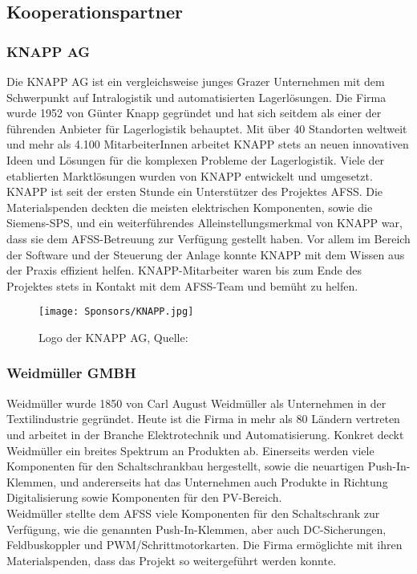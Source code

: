 \subsection{Kooperationspartner}

\subsubsection{KNAPP AG}
Die KNAPP AG ist ein vergleichsweise junges Grazer Unternehmen mit dem Schwerpunkt auf Intralogistik und automatisierten Lagerlösungen. Die Firma wurde 1952 von Günter Knapp gegründet und hat sich seitdem als einer der führenden Anbieter für Lagerlogistik behauptet. Mit über 40 Standorten weltweit und mehr als 4.100 MitarbeiterInnen arbeitet KNAPP stets an neuen innovativen Ideen und Lösungen für die komplexen Probleme der Lagerlogistik. Viele der etablierten Marktlösungen wurden von KNAPP entwickelt und umgesetzt. \cite{knapp}\\
KNAPP ist seit der ersten Stunde ein Unterstützer des Projektes AFSS. Die Materialspenden deckten die meisten elektrischen Komponenten, sowie die Siemens-SPS, und ein weiterführendes Alleinstellungsmerkmal von KNAPP war, dass sie dem AFSS-Betreuung zur Verfügung gestellt haben. Vor allem im Bereich der Software und der Steuerung der Anlage konnte KNAPP mit dem Wissen aus der Praxis effizient helfen. KNAPP-Mitarbeiter waren bis zum Ende des Projektes stets in Kontakt mit dem AFSS-Team und bemüht zu helfen.

\begin{figure}[H]
    \centering
    \texttt{[image: Sponsors/KNAPP.jpg]}
    \caption{Logo der KNAPP AG, Quelle: \cite{knapp_logo}}
    \label{fig:knapp_logo}
\end{figure}


\subsubsection{Weidmüller GMBH}

Weidmüller wurde 1850 von Carl August Weidmüller als Unternehmen in der Textilindustrie gegründet. Heute ist die Firma in mehr als 80 Ländern vertreten und arbeitet in der Branche Elektrotechnik und Automatisierung. Konkret deckt Weidmüller ein breites Spektrum an Produkten ab. Einerseits werden viele Komponenten für den Schaltschrankbau hergestellt, sowie die neuartigen Push-In-Klemmen, und andererseits hat das Unternehmen auch Produkte in Richtung Digitalisierung sowie Komponenten für den PV-Bereich. \cite{weidmueller}\\
Weidmüller stellte dem AFSS viele Komponenten für den Schaltschrank zur Verfügung, wie die genannten Push-In-Klemmen, aber auch DC-Sicherungen, Feldbuskoppler und PWM/Schrittmotorkarten. Die Firma ermöglichte mit ihren Materialspenden, dass das Projekt so weitergeführt werden konnte. 


